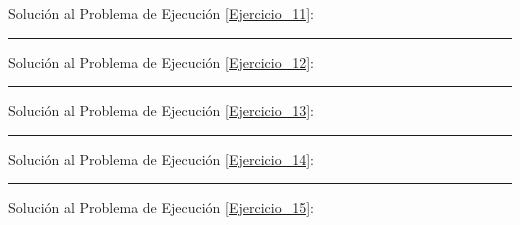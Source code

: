 \documentclass[12pt, letter]{exam}
\begin{document}
Solución al Problema de Ejecución \ref{Ejercicio_11}:

\vspace*{3.5cm}
\rule{0.9\textwidth}{0.3mm}

Solución al Problema de Ejecución \ref{Ejercicio_12}:

\vspace*{3.5cm}
\rule{0.9\textwidth}{0.3mm}

Solución al Problema de Ejecución \ref{Ejercicio_13}:

\vspace*{3.5cm}
\rule{0.9\textwidth}{0.3mm}

Solución al Problema de Ejecución \ref{Ejercicio_14}:


\newpage

\rule{0.9\textwidth}{0.3mm}

Solución al Problema de Ejecución \ref{Ejercicio_15}:
\end{document}
